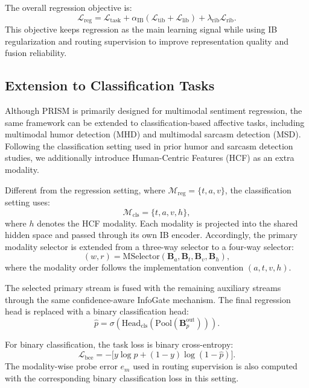 \documentclass[11pt]{article}
\begin{document}
The overall regression objective is:
\begin{equation}
\mathcal{L}_{\mathrm{reg}}
=
\mathcal{L}_{\mathrm{task}}
+
\alpha_{\mathrm{IB}}
(\mathcal{L}_{\mathrm{tib}}+\mathcal{L}_{\mathrm{lib}})
+
\lambda_{\mathrm{rib}}\mathcal{L}_{\mathrm{rib}}.
\end{equation}
This objective keeps regression as the main learning signal while using IB
regularization and routing supervision to improve representation quality and
fusion reliability.

\subsection{Extension to Classification Tasks}
\label{sec:method-cls}

Although PRISM is primarily designed for multimodal sentiment regression, the
same framework can be extended to classification-based affective tasks,
including multimodal humor detection (MHD) and multimodal sarcasm detection
(MSD). Following the classification setting used in prior humor and sarcasm
detection studies, we additionally introduce Human-Centric Features (HCF) as
an extra modality.

Different from the regression setting, where
$\mathcal{M}_{\mathrm{reg}}=\{t,a,v\}$, the classification setting uses:
\begin{equation}
\mathcal{M}_{\mathrm{cls}}=\{t,a,v,h\},
\end{equation}
where $h$ denotes the HCF modality. Each modality is projected into the shared
hidden space and passed through its own IB encoder. Accordingly, the primary
modality selector is extended from a three-way selector to a four-way selector:
\begin{equation}
(w,r)=
\mathrm{MSelector}(\mathbf{B}_a,\mathbf{B}_t,\mathbf{B}_v,\mathbf{B}_h),
\end{equation}
where the modality order follows the implementation convention
$(a,t,v,h)$.

The selected primary stream is fused with the remaining auxiliary streams
through the same confidence-aware InfoGate mechanism. The final regression
head is replaced with a binary classification head:
\begin{equation}
\hat{p}
=
\sigma\!\left(
\mathrm{Head}_{\mathrm{cls}}
(
\mathrm{Pool}(\mathbf{B}_p^{\mathrm{out}})
)
\right).
\end{equation}

For binary classification, the task loss is binary cross-entropy:
\begin{equation}
\mathcal{L}_{\mathrm{bce}}
=
-\bigl[
y\log\hat{p}
+
(1-y)\log(1-\hat{p})
\bigr].
\end{equation}
The modality-wise probe error $e_m$ used in routing supervision is also
computed with the corresponding binary classification loss in this setting.
\end{document}
